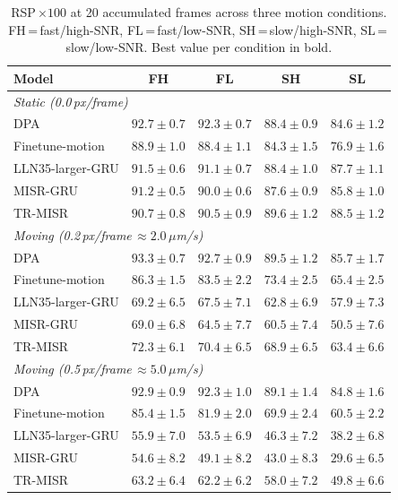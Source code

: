 \begin{table}[h]
  \centering
  \caption{RSP\,$\times 100$ at 20 accumulated frames across three motion conditions. FH\,=\,fast/high-SNR,
  FL\,=\,fast/low-SNR, SH\,=\,slow/high-SNR, SL\,=\,slow/low-SNR. Best value per condition in bold.}
  \label{tab:rsp_combined}
  \begin{tabular}{lcccc}
  \toprule
  \textbf{Model} & \textbf{FH} & \textbf{FL} & \textbf{SH} & \textbf{SL} \\
  \midrule
  \multicolumn{5}{l}{\textit{Static (0.0\,px/frame)}} \\
  DPA        & $\mathbf{92.7} \pm 0.7$ & $\mathbf{92.3} \pm 0.7$ & $88.4 \pm 0.9$ & $84.6 \pm 1.2$ \\
  Finetune-motion   & $88.9 \pm 1.0$ & $88.4 \pm 1.1$ & $84.3 \pm 1.5$ & $76.9 \pm 1.6$ \\
  LLN35-larger-GRU  & $91.5 \pm 0.6$ & $91.1 \pm 0.7$ & $88.4 \pm 1.0$ & $87.7 \pm 1.1$ \\
  MISR-GRU          & $91.2 \pm 0.5$ & $90.0 \pm 0.6$ & $87.6 \pm 0.9$ & $85.8 \pm 1.0$ \\
  TR-MISR           & $90.7 \pm 0.8$ & $90.5 \pm 0.9$ & $\mathbf{89.6} \pm 1.2$ & $\mathbf{88.5} \pm 1.2$ \\
  \midrule
  \multicolumn{5}{l}{\textit{Moving (0.2\,px/frame\,$\approx 2.0\,\mu$m/s)}} \\
  DPA        & $\mathbf{93.3} \pm 0.7$ & $\mathbf{92.7} \pm 0.9$ & $\mathbf{89.5} \pm 1.2$ & $\mathbf{85.7} \pm
  1.7$ \\
  Finetune-motion   & $86.3 \pm 1.5$ & $83.5 \pm 2.2$ & $73.4 \pm 2.5$ & $65.4 \pm 2.5$ \\
  LLN35-larger-GRU  & $69.2 \pm 6.5$ & $67.5 \pm 7.1$ & $62.8 \pm 6.9$ & $57.9 \pm 7.3$ \\
  MISR-GRU          & $69.0 \pm 6.8$ & $64.5 \pm 7.7$ & $60.5 \pm 7.4$ & $50.5 \pm 7.6$ \\
  TR-MISR           & $72.3 \pm 6.1$ & $70.4 \pm 6.5$ & $68.9 \pm 6.5$ & $63.4 \pm 6.6$ \\
  \midrule
  \multicolumn{5}{l}{\textit{Moving (0.5\,px/frame\,$\approx 5.0\,\mu$m/s)}} \\
  DPA        & $\mathbf{92.9} \pm 0.9$ & $\mathbf{92.3} \pm 1.0$ & $\mathbf{89.1} \pm 1.4$ & $\mathbf{84.8} \pm
  1.6$ \\
  Finetune-motion   & $85.4 \pm 1.5$ & $81.9 \pm 2.0$ & $69.9 \pm 2.4$ & $60.5 \pm 2.2$ \\
  LLN35-larger-GRU  & $55.9 \pm 7.0$ & $53.5 \pm 6.9$ & $46.3 \pm 7.2$ & $38.2 \pm 6.8$ \\
  MISR-GRU          & $54.6 \pm 8.2$ & $49.1 \pm 8.2$ & $43.0 \pm 8.3$ & $29.6 \pm 6.5$ \\
  TR-MISR           & $63.2 \pm 6.4$ & $62.2 \pm 6.2$ & $58.0 \pm 7.2$ & $49.8 \pm 6.6$ \\
  \bottomrule
  \end{tabular}
  \end{table}


